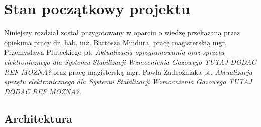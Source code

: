 
\chapter{Stan początkowy projektu}
\label{cha:pocz}

Niniejszy rozdział został przygotowany w oparciu o wiedzę przekazaną przez opiekuna pracy dr. hab. inż. Bartosza Mindura, pracę magisterskią mgr. Przemysława Pluteckiego pt. \textit{Aktualizacja oprogramowania oraz sprzetu elektronicznego dla Systemu Stabilizacji Wzmocnienia Gazowego TUTAJ DODAC REF MOZNA?} oraz pracę magisterską mgr. Pawła Zadrożniaka pt. \textit{Aktualizacja sprzętu elektronicznego dla Systemu Stabilizacji Wzmocnienia Gazowego TUTAJ DODAC REF MOZNA?}.

\section{Architektura}


